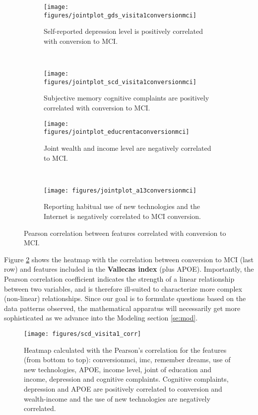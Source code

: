 \documentclass[11pt]{article}
\theoremstyle{definition}
\theoremstyle{remark}
\begin{document}
\begin{figure}[H]
    \centering
    \begin{subfigure}[t]{0.45\textwidth}
        \centering
        \texttt{[image: figures/jointplot\_gds\_visita1conversionmci]}
        \caption{Self-reported depression level is positively correlated with conversion to MCI.}
    \end{subfigure}
    ~ 
    \begin{subfigure}[t]{0.45\textwidth}
        \centering
        \texttt{[image: figures/jointplot\_scd\_visita1conversionmci]}
        \caption{Subjective memory cognitive complaints are positively correlated with conversion to MCI.}
    \end{subfigure}%
    
     \begin{subfigure}[t]{0.45\textwidth}
        \centering
        \texttt{[image: figures/jointplot\_educrentaconversionmci]}
        \caption{Joint wealth and income level are negatively correlated to MCI.}
    \end{subfigure}
    ~ 
    \begin{subfigure}[t]{0.45\textwidth}
        \centering
        \texttt{[image: figures/jointplot\_a13conversionmci]}
        \caption{Reporting habitual use of new technologies and the Internet is negatively correlated to MCI conversion.}
    \end{subfigure}%
   
    \caption{Pearson correlation between features correlated with conversion to MCI.} \label{fig:multico}
\end{figure}

Figure \ref{fig:heatmappearson} shows the heatmap with the correlation between conversion to MCI (last row) and features included in the \textbf{Vallecas index} (plus APOE). 
Importantly, the Pearson correlation coefficient indicates the strength of a linear relationship between two variables, and is therefore ill-suited to characterize more complex (non-linear) relationships.
Since our goal is to formulate questions based on the data patterns observed, the mathematical apparatus will necessarily get more sophisticated as we advance into the Modeling section \ref{se:mod}. 
 
 \begin{figure}[H]
        \centering
        \texttt{[image: figures/scd\_visita1\_corr]}
        \caption{Heatmap calculated with the Pearson's correlation for the features (from bottom to top): conversionmci, imc, remember dreams, use of new technologies, APOE, income level, joint of education and income, depression and cognitive complaints. Cognitive complaints, depression and APOE are positively correlated to conversion and wealth-income and the use of new technologies are negatively correlated. 
        } \label{fig:heatmappearson}
\end{figure}
\end{document}
